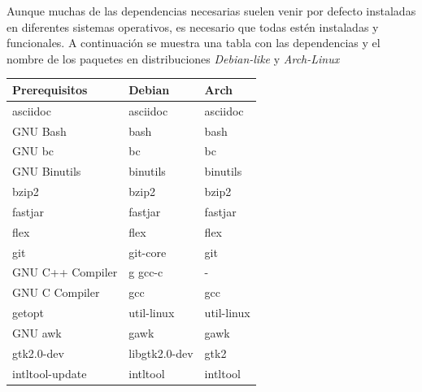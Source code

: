 \documentclass[12pt]{article}
\begin{document}
        Aunque muchas de las dependencias necesarias suelen venir por defecto instaladas en diferentes sistemas operativos, es necesario que todas estén instaladas y funcionales. A continuación se muestra una tabla con las dependencias y el nombre de los paquetes en distribuciones \textit{Debian-like} y \textit{Arch-Linux} 

            \begin{tabular}{|l|l|l|}
                \hline
                \textbf{Prerequisitos}  & \textbf{Debian}   & \textbf{Arch}             \\           
                \hline
                asciidoc                & asciidoc          & asciidoc                  \\
                GNU Bash                & bash              & bash                      \\
                GNU bc                  & bc                & bc                        \\
                GNU Binutils            & binutils          & binutils                  \\
                bzip2                   & bzip2             & bzip2                     \\
                fastjar                 & fastjar           & fastjar                   \\
                flex                    & flex              & flex                      \\
                git                     & git-core          & git                       \\
                GNU C++ Compiler        & g gcc-c           & -                         \\
                GNU C Compiler          & gcc               & gcc                       \\
                getopt                  & util-linux        & util-linux                \\
                GNU awk                 & gawk              & gawk                      \\
                gtk2.0-dev              & libgtk2.0-dev     & gtk2                      \\
                intltool-update         & intltool          & intltool                  \\

\end{tabular}
\end{document}
